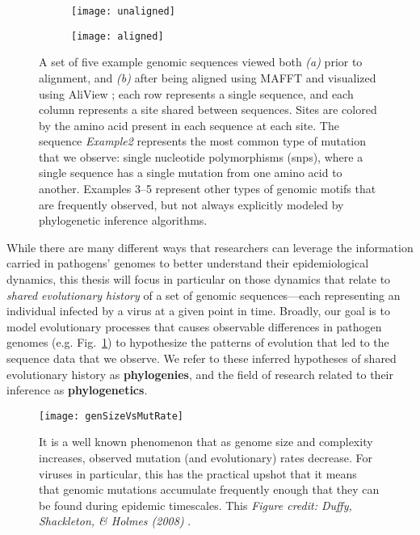 \begin{figure}[ht]
  \centering
  \begin{subfigure}{0.95\textwidth}
    \texttt{[image: unaligned]}
    \caption{}
  \end{subfigure}
  \begin{subfigure}{0.95\textwidth}
    \texttt{[image: aligned]}
    \caption{}
  \end{subfigure}
  \caption[Multiple sequence alignment]{A set of five example genomic sequences viewed both \textit{(a)} prior to alignment, and \textit{(b)} after being aligned using MAFFT \citep{katoh2013mafft} and visualized using AliView \citep{larsson2014aliview}; each row represents a single sequence, and each column represents a site shared between sequences. Sites are colored by the amino acid present in each sequence at each site. The sequence \textit{Example2} represents the most common type of mutation that we observe: single nucleotide polymorphisms (\gls{snp}s), where a single sequence has a single mutation from one amino acid to another. Examples 3--5 represent other types of genomic motifs that are frequently observed, but not always explicitly modeled by phylogenetic inference algorithms.}
  \label{fig:alignment}
\end{figure}

While there are many different ways that researchers can leverage the information carried in pathogens' genomes to better understand their epidemiological dynamics, this thesis will focus in particular on those dynamics that relate to \textit{shared evolutionary history} of a set of genomic sequences---each representing an individual infected by a virus at a given point in time.
Broadly, our goal is to model evolutionary processes that causes observable differences in pathogen genomes (e.g. Fig.~\ref{fig:alignment}) to hypothesize the patterns of evolution that led to the sequence data that we observe.
We refer to these inferred hypotheses of shared evolutionary history as \textbf{phylogenies}, and the field of research related to their inference as \textbf{phylogenetics}.

\begin{figure}[ht]
  \centering
  \texttt{[image: genSizeVsMutRate]}
  \caption[Genome size vs. mutation rate in viruses.]{It is a well known phenomenon that as genome size and complexity increases, observed mutation (and evolutionary) rates decrease. For viruses in particular, this has the practical upshot that it means that genomic mutations accumulate frequently enough that they can be found during epidemic timescales. This  \textit{Figure credit: Duffy, Shackleton, \& Holmes (2008)} \citep{duffy2008rates}.}
  \label{fig:sizeVsRates}
\end{figure}

